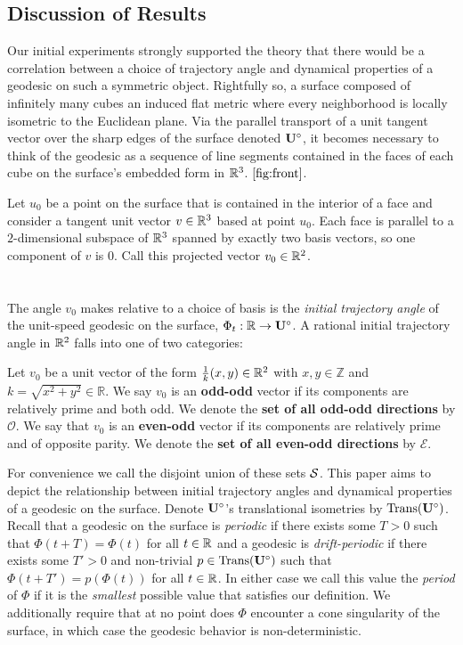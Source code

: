 \documentclass[]{article}
\begin{document}
\subsection{Discussion of Results}
Our initial experiments strongly supported the theory that there would be a correlation between a choice of trajectory angle and dynamical properties of a geodesic on such a symmetric object. Rightfully so, a surface composed of infinitely many cubes an induced flat metric where every neighborhood is locally isometric to the Euclidean plane. Via the parallel transport of a unit tangent vector over the sharp edges of the surface denoted $\mathbf{U}^\circ$, it becomes necessary to think of the geodesic as a sequence of line segments contained in the faces of each cube on the surface's embedded form in $\mathbb{R}^3$. $\ref{fig:front}$.
\\
\begin{figure}

\end{figure}
\noindent Let $u_0$ be a point on the surface that is contained in the interior of a face and consider a tangent unit vector $v\in\mathbb{R}^3$ based at point $u_0$. Each face is parallel to a $2$-dimensional subspace of $\mathbb{R}^3$ spanned by exactly two basis vectors, so one component of $v$ is 0. Call this projected vector $v_0\in\mathbb{R}^2$.
\\\\\\
The angle $v_0$ makes relative to a choice of basis is the \emph{initial trajectory angle} of the unit-speed geodesic on the surface, $\Phi_t:\mathbb{R}\rightarrow\mathbf{U}^\circ$. A rational initial trajectory angle in $\mathbb{R}^2$ falls into one of two categories:
\begin{Def}
Let $v_0$ be a unit vector of the form $\frac{1}{k}(x,y)\in\mathbb{R}^2$ with $x,y\in\mathbb{Z}$ and $k=\sqrt{x^2+y^2}\in\mathbb{R}$. We say $v_0$ is an \textbf{odd-odd} vector if its components are relatively prime and both odd. We denote the \textbf{set of all odd-odd directions} by $\mathcal{O}$. We say that $v_0$ is an \textbf{even-odd} vector if its components are relatively prime and of opposite parity. We denote the \textbf{set of all even-odd directions} by $\mathcal{E}$.
\end{Def}
\noindent For convenience we call the disjoint union of these sets $\mathcal{S}$. This paper aims to depict the relationship between initial trajectory angles and dynamical properties of a geodesic on the surface. Denote $\mathbf{U}^\circ$'s translational isometries by $\text{Trans}(\mathbf{U}^\circ)$. Recall that a geodesic on the surface is \emph{periodic} if there exists some $T>0$ such that $\Phi(t+T)=\Phi(t)$ for all $t\in\mathbb{R}$ and a geodesic is \emph{drift-periodic} if there exists some $T'>0$ and non-trivial $p\in \text{Trans}(\mathbf{U}^\circ)$ such that $\Phi(t+T')=p(\Phi(t))$ for all $t\in\mathbb{R}$. In either case we call this value the \emph{period} of $\Phi$ if it is the \emph{smallest} possible value that satisfies our definition. We additionally require that at no point does $\Phi$ encounter a cone singularity of the surface, in which case the geodesic behavior is non-deterministic.
\end{document}
